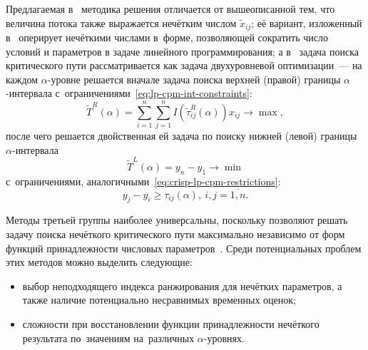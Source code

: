 Предлагаемая в~\cite{Indians_FCPM} методика решения отличается от вышеописанной тем, что величина потока также выражается нечётким числом $\tilde x_{ij}$; её вариант, изложенный в~\cite{Kumar_FCPM_Triangular} оперирует нечёткими числами в~форме, позволяющей сократить число условий и параметров в задаче линейного программирования; а в~\cite{Egyptians, Chen_CPM} задача поиска критического пути рассматривается как задача двухуровневой оптимизации~--- на каждом $\alpha$-уровне решается вначале задача поиска верхней (правой) границы $\alpha$-интервала с~ограничениями~\eqref{eq:lp-cpm-int-constraints}:
\begin{equation*}
  \tilde T^R \left( \alpha \right) = \sum \limits_{i=1}^{n} \sum \limits_{j=1}^{n} I\left(\tilde \tau_{ij}^R \left(\alpha \right) \right)x_{ij} \to \max,
\end{equation*}
после чего решается двойственная ей задача по поиску нижней (левой) границы $\alpha$-интервала
\begin{equation*}
  \tilde T^L \left( \alpha \right) = y_n-y_1 \to \min
\end{equation*}
с~ограничениями, аналогичными~\eqref{eq:crisp-lp-cpm-restrictions}:
\begin{equation*}
  y_j-y_i \geqslant \tau_{ij}\left( \alpha \right),\ i,j=\overline{1, n}.
\end{equation*}

Методы третьей группы наиболее универсальны, поскольку позволяют решать задачу поиска нечёткого критического пути максимально независимо от форм функций принадлежности числовых параметров~\cite{MEI-1, PhD_Starodubtsev}. Среди потенциальных проблем этих методов можно выделить следующие:
\begin{itemize}
  \item выбор неподходящего индекса ранжирования для нечётких параметров, а также наличие потенциально несравнимых временных оценок;
  \item сложности при восстановлении функции принадлежности нечёткого результата по~значениям на~различных $\alpha$-уровнях.
\end{itemize}